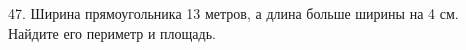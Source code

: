 47. Ширина прямоугольника 13 метров, а длина больше ширины на 4 см. Найдите его периметр и площадь.\\

